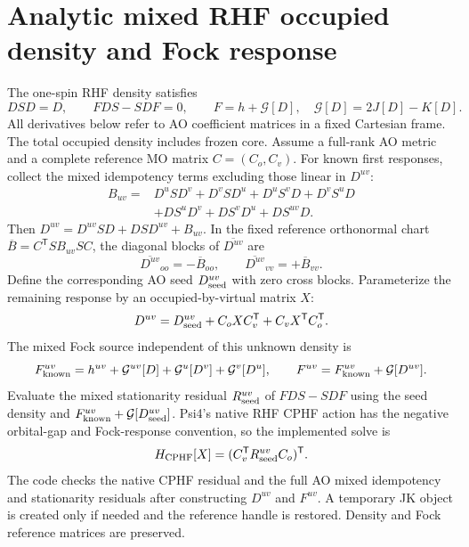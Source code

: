 \documentclass[11pt]{article}
\begin{document}
\section{Analytic mixed RHF occupied density and Fock response}
The one-spin RHF density satisfies
\begin{equation}
 D S D=D,\qquad F D S-S D F=0,\qquad F=h+\mathcal G[D],
 \quad\mathcal G[D]=2J[D]-K[D].
\end{equation}
All derivatives below refer to AO coefficient matrices in a fixed Cartesian
frame. The total occupied density includes frozen core. Assume a full-rank
AO metric and a complete reference MO matrix $C=(C_o,C_v)$.
For known first responses, collect the mixed idempotency terms excluding
those linear in $D^{uv}$:
\begin{align}
 B_{uv}={}&D^u S D^v+D^v S D^u+D^u S^v D+D^v S^u D\nonumber\\
          &+D S^u D^v+D S^v D^u+D S^{uv}D.
\end{align}
Then $D^{uv}=D^{uv}SD+DSD^{uv}+B_{uv}$. In the fixed reference
orthonormal chart $\overline B=C^{\mathsf T}S B_{uv}S C$, the diagonal
blocks of $\overline {D^{uv}}$ are
\begin{equation}
 \overline {D^{uv}}_{oo}=-\overline B_{oo},\qquad
 \overline {D^{uv}}_{vv}=+\overline B_{vv}.
\end{equation}
Define the corresponding AO seed $D_{\rm seed}^{uv}$ with zero cross
blocks. Parameterize the remaining response by an occupied-by-virtual
matrix $X$:
\begin{equation}
 D^{uv}=D_{\rm seed}^{uv}+C_o X C_v^{\mathsf T}+C_v X^{\mathsf T}C_o^{\mathsf T}.
\end{equation}
The mixed Fock source independent of this unknown density is
\begin{equation}
 F_{\rm known}^{uv}=h^{uv}+\mathcal G^{uv}[D]
                       +\mathcal G^u[D^v]+\mathcal G^v[D^u],\qquad
 F^{uv}=F_{\rm known}^{uv}+\mathcal G[D^{uv}].
\end{equation}
Evaluate the mixed stationarity residual $R_{\rm seed}^{uv}$ of
$FDS-SDF$ using the seed density and
$F_{\rm known}^{uv}+\mathcal G[D_{\rm seed}^{uv}]$.
Psi4's native RHF CPHF action has the negative orbital-gap and Fock-response
convention, so the implemented solve is
\begin{equation}
 H_{\rm CPHF}[X]=(C_v^{\mathsf T}R_{\rm seed}^{uv}C_o)^{\mathsf T}.
\end{equation}
The code checks the native CPHF residual and the full AO mixed idempotency
and stationarity residuals after constructing $D^{uv}$ and $F^{uv}$.
A temporary JK object is created only if needed and the reference handle
is restored. Density and Fock reference matrices are preserved.
\end{document}
